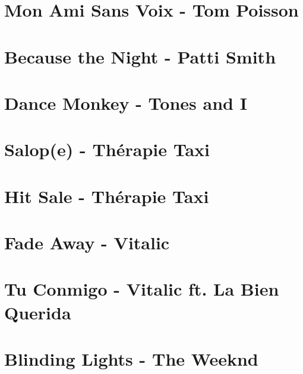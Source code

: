\documentclass[11pt]{article}
\begin{document}
\section{Mon Ami Sans Voix - Tom Poisson}
\begin{guitar}

\end{guitar}

\section{Because the Night - Patti Smith}


\section{Dance Monkey - Tones and I}
\begin{guitar}

\end{guitar}

\section{Salop(e) - Thérapie Taxi}
\begin{guitar}

\end{guitar}

\section{Hit Sale - Thérapie Taxi}
\begin{guitar}

\end{guitar}

\section{Fade Away - Vitalic}


\section{Tu Conmigo - Vitalic ft. La Bien Querida}


\section{Blinding Lights - The Weeknd}
\begin{guitar}

\end{guitar}
\end{document}
